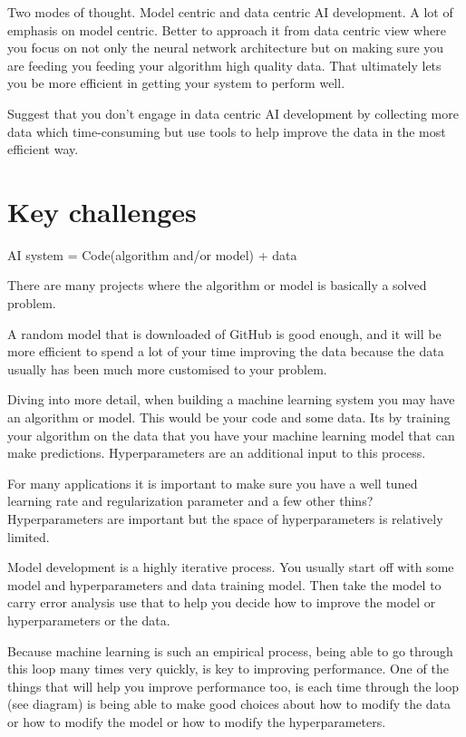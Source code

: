 Two modes of thought.
Model centric and data centric AI development.
A lot of emphasis on model centric.
Better to approach it from data centric view where you focus on not only the neural network architecture but on making sure you are feeding you feeding your algorithm high quality data.
That ultimately lets you be more efficient in getting your system to perform well.

Suggest that you don't engage in data centric AI development by collecting more data which time-consuming but use tools to help improve the data in the most efficient way.

\section{Key challenges}

AI system = Code(algorithm and/or model) + data

There are many projects where the algorithm or model is basically a solved problem.

A random model that is downloaded of GitHub is good enough, and it will be more efficient to spend a lot of your time improving the data because the data usually has been much more customised to your problem.


Diving into more detail, when building a machine learning system you may have an algorithm or model.
This would be your code and some data.
Its by training your algorithm on the data that you have your machine learning model that can make predictions.
Hyperparameters are an additional input to this process.

For many applications it is important to make sure you have a well tuned learning rate and regularization parameter and a few other thins?
Hyperparameters are important but the space of hyperparameters is relatively limited.

Model development is a highly iterative process.
You usually start off with some model and hyperparameters and data training model.
Then take the model to carry error analysis use that to help you decide how to improve the model or hyperparameters or the data.

Because machine learning is such an empirical process, being able to go through this loop many times very quickly, is key to improving performance.
One of the things that will help you improve performance too, is each time through the loop (see diagram) is being able to make good choices about how to modify the data or how to modify the model or how to modify the hyperparameters.

